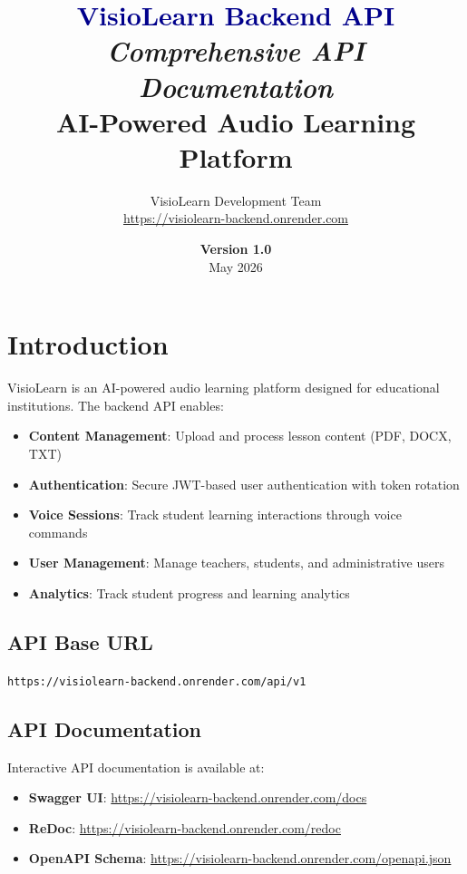 \documentclass[12pt,a4paper,oneside]{article}
\title{%
    \vspace{2cm}
    \Huge\textbf{\textcolor{darkblue}{VisioLearn Backend API}} \\
    \vspace{0.5cm}
    \Large\textit{Comprehensive API Documentation} \\
    \vspace{2cm}
    \large\textbf{AI-Powered Audio Learning Platform}
}
\author{%
    VisioLearn Development Team \\
    \vspace{0.5cm}
    \href{https://visiolearn-backend.onrender.com}{https://visiolearn-backend.onrender.com}
}
\date{\vspace{1cm}\large \textbf{Version 1.0} \\ May 2026}
\begin{document}
\maketitle
\thispagestyle{empty}
\newpage

\tableofcontents
\newpage

\section{Introduction}

VisioLearn is an AI-powered audio learning platform designed for educational institutions. The backend API enables:

\begin{itemize}
    \item \textbf{Content Management}: Upload and process lesson content (PDF, DOCX, TXT)
    \item \textbf{Authentication}: Secure JWT-based user authentication with token rotation
    \item \textbf{Voice Sessions}: Track student learning interactions through voice commands
    \item \textbf{User Management}: Manage teachers, students, and administrative users
    \item \textbf{Analytics}: Track student progress and learning analytics
\end{itemize}

\subsection{API Base URL}
\begin{tcolorbox}[colback=lightblue, colframe=darkblue]
\texttt{https://visiolearn-backend.onrender.com/api/v1}
\end{tcolorbox}

\subsection{API Documentation}
Interactive API documentation is available at:
\begin{itemize}
    \item \textbf{Swagger UI}: \url{https://visiolearn-backend.onrender.com/docs}
    \item \textbf{ReDoc}: \url{https://visiolearn-backend.onrender.com/redoc}
    \item \textbf{OpenAPI Schema}: \url{https://visiolearn-backend.onrender.com/openapi.json}
\end{itemize}
\end{document}
